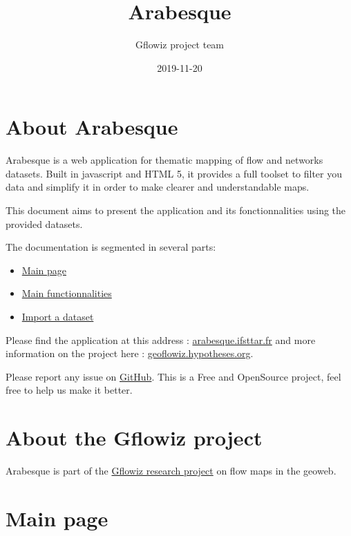 \documentclass[]{book}
\title{Arabesque}
\author{Gflowiz project team}
\date{2019-11-20}
\providecommand{\tightlist}{%
  \setlength{\itemsep}{0pt}\setlength{\parskip}{0pt}}
\begin{document}
\maketitle

{
\setcounter{tocdepth}{1}
\tableofcontents
}
\hypertarget{about-arabesque}{%
\chapter{About Arabesque}\label{about-arabesque}}

Arabesque is a web application for thematic mapping of flow and networks datasets.
Built in javascript and HTML 5, it provides a full toolset to filter you data
and simplify it in order to make clearer and understandable maps.

This document aims to present the application and its fonctionnalities using
the provided datasets.

The documentation is segmented in several parts:

\begin{itemize}
\tightlist
\item
  \href{./main-page.html}{Main page}
\item
  \href{./functionnalities.html}{Main functionnalities}
\item
  \href{./import-a-dataset.html}{Import a dataset}
\end{itemize}

Please find the application at this address : \href{http://arabesque.ifsttar.fr/}{arabesque.ifsttar.fr} and more information on the project here : \href{https://geoflowiz.hypotheses.org/}{geoflowiz.hypotheses.org}.

Please report any issue on \href{https://github.com/gflowiz/arabesque}{GitHub}. This is a Free and OpenSource project, feel free to help us make it better.

\hypertarget{about-the-gflowiz-project}{%
\chapter{About the Gflowiz project}\label{about-the-gflowiz-project}}

Arabesque is part of the \href{https://geoflowiz.hypotheses.org/}{Gflowiz research project} on flow maps in the geoweb.

\hypertarget{main-page}{%
\chapter{Main page}\label{main-page}}
\end{document}
